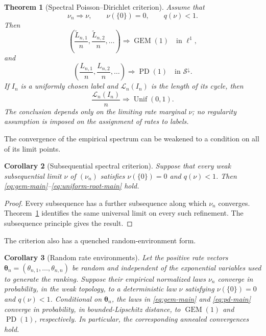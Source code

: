 \documentclass[11pt]{article}
\newtheorem{theorem}{Theorem}[section]
\newtheorem{corollary}[theorem]{Corollary}
\theoremstyle{definition}
\theoremstyle{remark}
\newcommand{\Unif}{\operatorname{Unif}}
\newcommand{\PD}{\operatorname{PD}}
\newcommand{\GEM}{\operatorname{GEM}}
\newcommand{\cS}{\mathcal S}
\begin{document}
\begin{theorem}[Spectral Poisson--Dirichlet criterion]
\label{thm:main-spectral}
Assume that
\[
  \nu_n\Rightarrow\nu,
  \qquad \nu(\{0\})=0,
  \qquad q(\nu)<1.
\]
Then
\begin{equation}
 \left(\frac{\widetilde L_{n,1}}n,
       \frac{\widetilde L_{n,2}}n,\ldots\right)
 \Rightarrow \GEM(1)
 \quad\text{in }\ell^1,
 \label{eq:gem-main}
\end{equation}
and
\begin{equation}
 \left(\frac{L_{n,1}}n,
       \frac{L_{n,2}}n,\ldots\right)
 \Rightarrow \PD(1)
 \quad\text{in }\cS^\downarrow.
 \label{eq:pd-main}
\end{equation}
If $I_n$ is a uniformly chosen label and $\mathscr L_n(I_n)$ is the length of
its cycle, then
\begin{equation}
  \frac{\mathscr L_n(I_n)}n\Rightarrow\Unif(0,1).
  \label{eq:uniform-root-main}
\end{equation}
The conclusion depends only on the limiting rate marginal $\nu$; no
regularity assumption is imposed on the assignment of rates to labels.
\end{theorem}

The convergence of the empirical spectrum can be weakened to a condition on
all of its limit points.

\begin{corollary}[Subsequential spectral criterion]
\label{cor:subsequential-spectral}
Suppose that every weak subsequential limit $\nu$ of $(\nu_n)$ satisfies
$\nu(\{0\})=0$ and $q(\nu)<1$.  Then
\eqref{eq:gem-main}--\eqref{eq:uniform-root-main} hold.
\end{corollary}

\begin{proof}
Every subsequence has a further subsequence along which $\nu_n$ converges.
Theorem~\ref{thm:main-spectral} identifies the same universal limit on every
such refinement.  The subsequence principle gives the result.
\end{proof}

The criterion also has a quenched random-environment form.

\begin{corollary}[Random rate environments]
\label{cor:random-environment}
Let the positive rate vectors
$\boldsymbol\theta_n=(\theta_{n,1},\ldots,\theta_{n,n})$ be random and
independent of the exponential variables used to generate the ranking.
Suppose their empirical normalized laws $\nu_n$ converge in probability, in
the weak topology, to a deterministic law $\nu$ satisfying
$\nu(\{0\})=0$ and $q(\nu)<1$.  Conditional on
$\boldsymbol\theta_n$, the laws in \eqref{eq:gem-main} and
\eqref{eq:pd-main} converge in probability, in bounded-Lipschitz distance, to
$\GEM(1)$ and $\PD(1)$, respectively.  In particular, the corresponding
annealed convergences hold.
\end{corollary}
\end{document}
